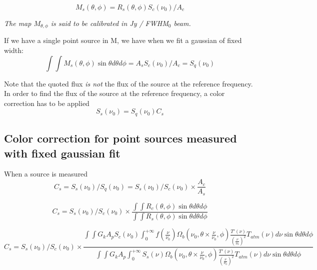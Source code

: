 \begin{equation}
M_{s}(\theta, \phi) = R_{s}(\theta, \phi)   S_{c} (\nu_{0}) / A_{c}
\end{equation}

 {\em The map $M_{\theta, \phi}$ is said to be calibrated in Jy / FWHM$_{0}$ beam.}

If we have a single point source in M, we have when we fit a gaussian
of fixed width:
\begin{equation}
\int \int M_{s}(\theta, \phi) \sin \theta d\theta d\phi = A_{s}  S_{c} (\nu_{0}) /
A_{c} = S_{q}(\nu_{0})
\end{equation}


Note that the quoted flux {\em is not} the flux of the source at the
reference frequency. In order to find the flux of the source at the
reference frequency, a color correction has to be applied
\begin{equation}
S_{s}(\nu_{0}) = S_{q}(\nu_{0})  C_{s}
\end{equation}

\subsection{Color correction for point sources measured with fixed
  gaussian fit}
\label{ap:color_correction_HA}

When a source is measured 
\begin{equation} 
C_{s} = S_{s} (\nu_{0}) / S_{q}(\nu_{0}) = S_{s}(\nu_0) / S_{c} (\nu_{0})  \times \frac{A_{c}}{A_{s}}
\end{equation}

\begin{equation} 
C_{s} = S_{s}(\nu_{0}) / S_{c} (\nu_{0})  \times \frac{\int \int
R_{c}(\theta, \phi) \sin \theta d\theta d\phi }{\int \int
R_{s}(\theta, \phi) \sin \theta d\theta d\phi }
\end{equation}

\begin{equation}
C_{s} = S_{s}(\nu_{0}) / S_{c} (\nu_{0})  \times \frac{
  \int\int G_{k} A_{p} S_{c}(\nu_{0})\int_{0}^{+\infty} f(\frac{\nu}{\nu_{0}}) \Omega_{b}(\nu_{0}, \theta \times \frac{\nu}{\nu_{0}},
\phi) \frac{T'(\nu)}{\left(\frac{\nu}{\nu_{0}}\right)^{2}} 
T_{atm}(\nu) d\nu \sin \theta d\theta d\phi}
{\int \int G_{k}
A_{p} \int_{0}^{+\infty} S_{s}(\nu) \Omega_{b}(\nu_{0}, \theta \times \frac{\nu}{\nu_{0}},
\phi) \frac{T'(\nu)}{\left(\frac{\nu}{\nu_{0}}\right)^{2}} 
T_{atm}(\nu) d\nu \sin \theta d\theta d\phi
}
\end{equation}

